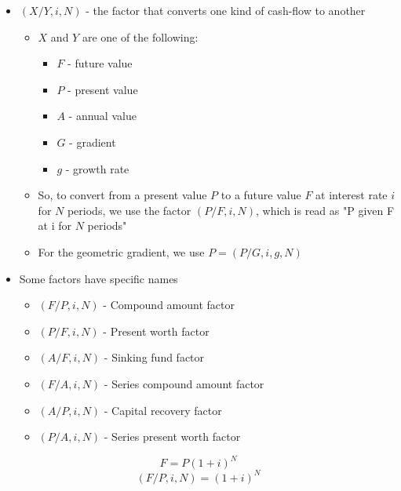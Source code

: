 \begin{theorem}
    \begin{itemize}
        \item $(X/Y, i, N)$ - the factor that converts one kind of cash-flow to another
              \begin{itemize}
                  \item $X$ and $Y$ are one of the following:
                        \begin{itemize}
                            \item $F$ - future value
                            \item $P$ - present value
                            \item $A$ - annual value
                            \item $G$ - gradient
                            \item $g$ - growth rate
                        \end{itemize}
                  \item So, to convert from a present value $P$ to a future value $F$ at interest rate $i$ for $N$ periods, we use the factor $(P/F, i, N)$, which is read as "P given F at i for $N$ periods"
                  \item For the geometric gradient, we use $P = (P/G, i, g, N)$
              \end{itemize}
        \item Some factors have specific names
              \begin{itemize}
                  \item $(F/P, i, N)$ - Compound amount factor
                  \item $(P/F, i, N)$ - Present worth factor
                  \item $(A/F, i, N)$ - Sinking fund factor
                  \item $(F/A, i, N)$ - Series compound amount factor
                  \item $(A/P, i, N)$ - Capital recovery factor
                  \item $(P/A, i, N)$ - Series present worth factor
              \end{itemize}
    \end{itemize}
\end{theorem}

\begin{corollary}
    \[
        F = P(1+i)^N
    \]
    \[
        (F/P, i, N) = (1+i)^N
    \]
\end{corollary}

